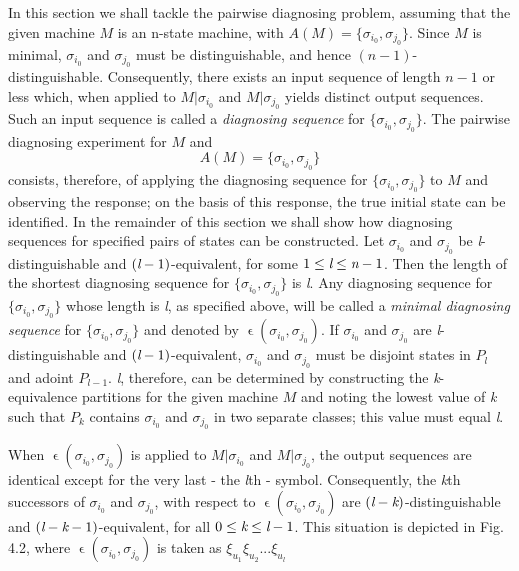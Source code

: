     In this section we shall tackle the pairwise diagnosing problem, assuming that the given machine $M$ is an n-state machine, with $A(M) = \{ \sigma_{i_{0}}, \sigma_{j_{0}} \}$. Since $M$ is minimal, $\sigma_{i_{0}}$ and $\sigma_{j_{0}}$ must be distinguishable, and hence $(n-1)$-distinguishable. Consequently, there exists an input sequence of length $n-1$ or less which, when applied to $ M|\sigma_{i_{0}}$ and $ M|\sigma_{j_{0}}$ yields distinct output sequences. Such an input sequence is called a \emph{diagnosing sequence} for $ \{  \sigma_{i_{0}}, \sigma_{j_{0}} \} $. The pairwise diagnosing experiment for $M$ and 
\begin{equation*}
    A(M) = \{ \sigma_{i_{0}}, \sigma_{j_{0}} \} 
\end{equation*}
consists, therefore, of applying the diagnosing sequence for $ \{  \sigma_{i_{0}}, \sigma_{j_{0}} \} $ to $M$ and observing the response; on the basis of this response, the true initial state can be identified. In the remainder of this section we shall show how diagnosing sequences for specified pairs of states can be constructed. Let $\sigma_{i_{0}}$ and $\sigma_{j_{0}}$ be \emph{l}-distinguishable and $(\emph{l}-1)$-equivalent, for some $1 \leq \emph{l} \leq \emph{n}-1 $. Then the length of the shortest diagnosing sequence for $ \{  \sigma_{i_{0}}, \sigma_{j_{0}} \} $ is \emph{l}. Any diagnosing sequence for $ \{  \sigma_{i_{0}}, \sigma_{j_{0}} \} $ whose length is \emph{l}, as specified above, will be called a \emph{minimal diagnosing sequence} for $ \{  \sigma_{i_{0}}, \sigma_{j_{0}} \} $ and denoted by $ \upvarepsilon(\sigma_{i_{0}}, \sigma_{j_{0}} )  $. If $\sigma_{i_{0}}$ and $\sigma_{j_{0}}$ are \emph{l}-distinguishable and $(\emph{l}-1)$-equivalent, $\sigma_{i_{0}}$ and $\sigma_{j_{0}}$ must be disjoint states in $P_l$ and adoint $P_{l-1}$. \emph{l}, therefore, can be determined by constructing the \emph{k}-equivalence partitions for the given machine $M$ and noting the lowest value of \emph{k} such that $P_k$ contains $\sigma_{i_{0}}$ and $\sigma_{j_{0}}$  in two separate classes; this value must equal \emph{l}.

When $ \upvarepsilon(\sigma_{i_{0}}, \sigma_{j_{0}} ) $ is applied to $ M|\sigma_{i_{0}}$ and $ M|\sigma_{j_{0}}$, the output sequences are identical except for the very last - the \emph{l}th - symbol. Consequently, the \emph{k}th successors of $\sigma_{i_{0}}$ and $\sigma_{j_{0}}$, with respect to $ \upvarepsilon(\sigma_{i_{0}}, \sigma_{j_{0}} ) $ are $ (\emph{l} - \emph{k})$-distinguishable and $(\emph{l} - \emph{k} - 1)$-equivalent, for all $0 \leq \emph{k} \leq \emph{l}-1 $. This situation is depicted in Fig. 4.2, where $ \upvarepsilon(\sigma_{i_{0}}, \sigma_{j_{0}} ) $  is taken as $\xi_{u_{1}}\xi_{u_{2}}...\xi_{u_{l}}$

